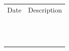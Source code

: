 \documentclass[10pt]{article}
\begin{document}
\vspace{0.5in}

\begin{tabular}{@{}p{1.5in}p{5in}}
Date & Description \\ \\ \\
\underline{\hspace{1.5in}}& \underline{\hspace{5in}} \\
\\ \\
\underline{\hspace{1.5in}}& \underline{\hspace{5in}} \\
\\ \\
\underline{\hspace{1.5in}}& \underline{\hspace{5in}} \\
\\ \\
\underline{\hspace{1.5in}}& \underline{\hspace{5in}} \\
\end{tabular}
\vspace{3in}
\vspace*{\fill}
\end{document}
